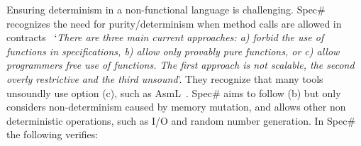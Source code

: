 Ensuring determinism in a non-functional language is challenging. Spec\# recognizes the need for purity/determinism when method calls are allowed in contracts~\cite{barnett200499} `\emph{There are three main current approaches: a) forbid the use of functions in specifications, b) allow only provably pure functions, or c) allow programmers free use
	of functions. The first approach is not scalable, the second overly restrictive and
	the third unsound}'.
	They recognize that many tools unsoundly use option (c), such as AsmL~\cite{barnett2003runtime}.
Spec\# aims to follow (b) but only considers non-determinism caused by memory mutation, and allows other non deterministic operations, such as I/O and random number generation. In Spec\# the following verifies:
